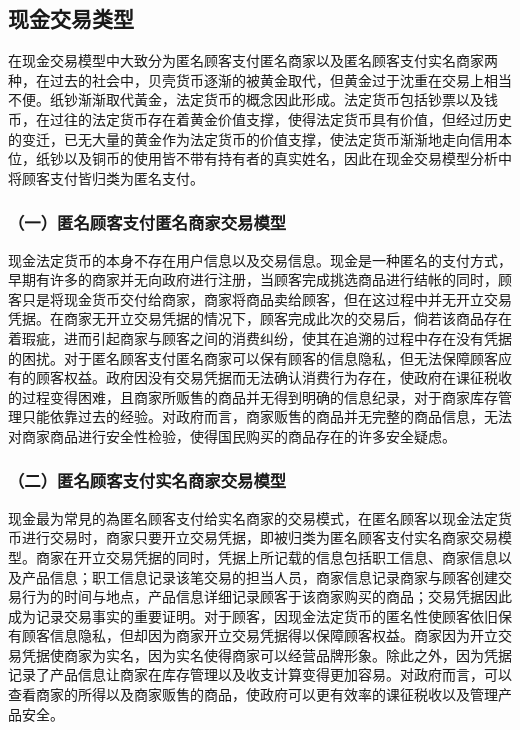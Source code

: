 	\subsection{现金交易类型}
	在现金交易模型中大致分为匿名顾客支付匿名商家以及匿名顾客支付实名商家两种，在过去的社会中，贝壳货币逐渐的被黄金取代，但黄金过于沈重在交易上相当不便。纸钞渐渐取代⿈⾦，法定货币的概念因此形成。法定货币包括钞票以及钱币，在过往的法定货币存在着黄金价值支撑，使得法定货币具有价值，但经过历史的变迁，已无⼤量的黄金作为法定货币的价值⽀撑，使法定货币渐渐地⾛向信⽤本位，纸钞以及铜币的使用皆不带有持有者的真实姓名，因此在现金交易模型分析中将顾客支付皆归类为匿名支付。

		\subsubsection{（一）匿名顾客支付匿名商家交易模型}
		现金法定货币的本身不存在用户信息以及交易信息。现⾦是一种匿名的支付方式，早期有许多的商家并无向政府进行注册，当顾客完成挑选商品进行结帐的同时，顾客只是将现金货币交付给商家，商家将商品卖给顾客，但在这过程中并无开立交易凭据。在商家无开立交易凭据的情况下，顾客完成此次的交易后，倘若该商品存在着瑕疵，进而引起商家与顾客之间的消费纠纷，使其在追溯的过程中存在没有凭据的困扰。对于匿名顾客支付匿名商家可以保有顾客的信息隐私，但无法保障顾客应有的顾客权益。政府因没有交易凭据而无法确认消费行为存在，使政府在课征税收的过程变得困难，且商家所贩售的商品并无得到明确的信息纪录，对于商家库存管理只能依靠过去的经验。对政府而言，商家贩售的商品并无完整的商品信息，无法对商家商品进行安全性检验，使得国民购买的商品存在的许多安全疑虑。

		\subsubsection{（二）匿名顾客支付实名商家交易模型}
		现⾦最为常⾒的為匿名顾客⽀付给实名商家的交易模式，在匿名顾客以现⾦法定货币进⾏交易时，商家只要开⽴交易凭据，即被归类为匿名顾客⽀付实名商家交易模型。商家在开⽴交易凭据的同时，凭据上所记载的信息包括职⼯信息、商家信息以及产品信息；职⼯信息记录该笔交易的担当人员，商家信息记录商家与顾客创建交易行为的时间与地点，产品信息详细记录顾客于该商家购买的商品；交易凭据因此成为记录交易事实的重要证明。对于顾客，因现⾦法定货币的匿名性使顾客依旧保有顾客信息隐私，但却因为商家开⽴交易凭据得以保障顾客权益。商家因为开⽴交易凭据使商家为实名，因为实名使得商家可以经营品牌形象。除此之外，因为凭据记录了产品信息让商家在库存管理以及收支计算变得更加容易。对政府⽽⾔，可以查看商家的所得以及商家贩售的商品，使政府可以更有效率的课征税收以及管理产品安全。

